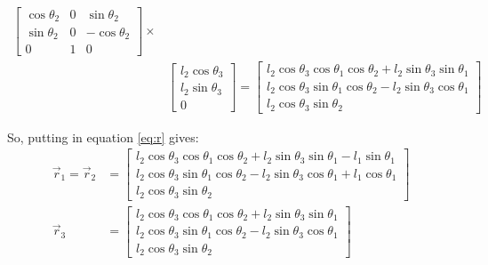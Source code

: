 \documentclass[conference]{IEEEtran}
\begin{document}
\begin{align*}
\begin{bmatrix}
        \cos \theta_2 & 0 & \sin \theta_2   \\
        \sin \theta_2 & 0 & - \cos \theta_2 \\
        0             & 1 & 0
    \end{bmatrix} \times                                                                                      \\
                                                                                       & \begin{bmatrix}
                                                                                             l_2 \cos \theta_3 \\
                                                                                             l_2 \sin \theta_3 \\
                                                                                             0
                                                                                         \end{bmatrix} =
    \begin{bmatrix}
        l_2 \cos \theta_3 \cos \theta_1 \cos \theta_2 + l_2 \sin \theta_3 \sin \theta_1 \\
        l_2 \cos \theta_3 \sin \theta_1 \cos \theta_2 - l_2 \sin \theta_3 \cos \theta_1 \\
        l_2 \cos \theta_3 \sin \theta_2
    \end{bmatrix} &
\end{align*}

So, putting in equation \ref{eq:r} gives:
{
\small
\begin{align*}
    \vec{r}_1 = \vec{r}_2 & = \begin{bmatrix}
                                  l_2 \cos \theta_3 \cos \theta_1 \cos \theta_2 + l_2 \sin \theta_3 \sin \theta_1 -l_1 \sin \theta_1 \\
                                  l_2 \cos \theta_3 \sin \theta_1 \cos \theta_2 - l_2 \sin \theta_3 \cos \theta_1 +l_1 \cos \theta_1 \\
                                  l_2 \cos \theta_3 \sin \theta_2
                              \end{bmatrix} \\
    \vec{r}_3             & = \begin{bmatrix}
                                  l_2 \cos \theta_3 \cos \theta_1 \cos \theta_2 + l_2 \sin \theta_3 \sin \theta_1 \\
                                  l_2 \cos \theta_3 \sin \theta_1 \cos \theta_2 - l_2 \sin \theta_3 \cos \theta_1 \\
                                  l_2 \cos \theta_3 \sin \theta_2
                              \end{bmatrix}
\end{align*}
}
\end{document}
